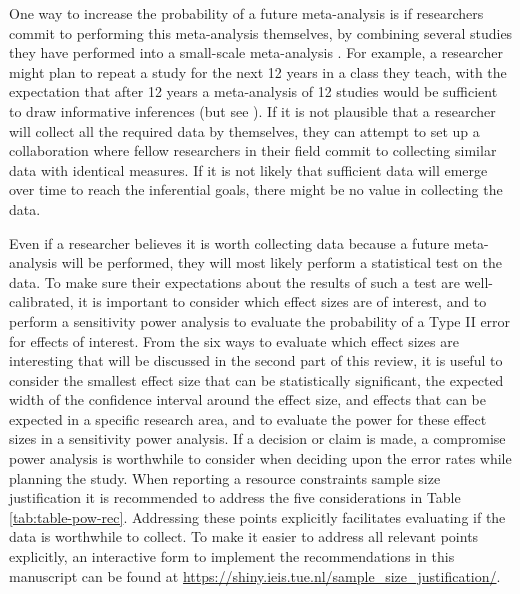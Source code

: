 \documentclass[
  oneside]{book}
\begin{document}
One way to increase the probability of a future meta-analysis is if researchers commit to performing this meta-analysis themselves, by combining several studies they have performed into a small-scale meta-analysis \citep{cumming_new_2014}. For example, a researcher might plan to repeat a study for the next 12 years in a class they teach, with the expectation that after 12 years a meta-analysis of 12 studies would be sufficient to draw informative inferences (but see \citet{ter_schure_accumulation_2019}). If it is not plausible that a researcher will collect all the required data by themselves, they can attempt to set up a collaboration where fellow researchers in their field commit to collecting similar data with identical measures. If it is not likely that sufficient data will emerge over time to reach the inferential goals, there might be no value in collecting the data.

Even if a researcher believes it is worth collecting data because a future meta-analysis will be performed, they will most likely perform a statistical test on the data. To make sure their expectations about the results of such a test are well-calibrated, it is important to consider which effect sizes are of interest, and to perform a sensitivity power analysis to evaluate the probability of a Type II error for effects of interest. From the six ways to evaluate which effect sizes are interesting that will be discussed in the second part of this review, it is useful to consider the smallest effect size that can be statistically significant, the expected width of the confidence interval around the effect size, and effects that can be expected in a specific research area, and to evaluate the power for these effect sizes in a sensitivity power analysis. If a decision or claim is made, a compromise power analysis is worthwhile to consider when deciding upon the error rates while planning the study. When reporting a resource constraints sample size justification it is recommended to address the five considerations in Table \ref{tab:table-pow-rec}. Addressing these points explicitly facilitates evaluating if the data is worthwhile to collect. To make it easier to address all relevant points explicitly, an interactive form to implement the recommendations in this manuscript can be found at \url{https://shiny.ieis.tue.nl/sample_size_justification/}.
\end{document}
